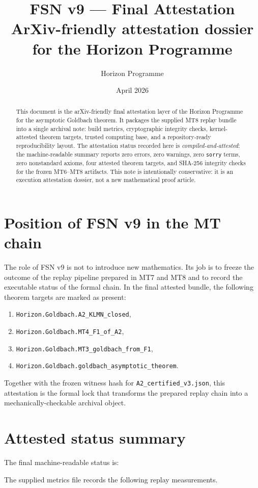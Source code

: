 \documentclass[11pt]{article}
\title{FSN v9 --- Final Attestation\\\large ArXiv-friendly attestation dossier for the Horizon Programme}
\author{Horizon Programme}
\date{April 2026}
\begin{document}
\maketitle

\begin{abstract}
This document is the arXiv-friendly final attestation layer of the Horizon Programme for the asymptotic Goldbach theorem. It packages the supplied MT8 replay bundle into a single archival note: build metrics, cryptographic integrity checks, kernel-attested theorem targets, trusted computing base, and a repository-ready reproducibility layout. The attestation status recorded here is \emph{compiled-and-attested}: the machine-readable summary reports zero errors, zero warnings, zero \texttt{sorry} terms, zero nonstandard axioms, four attested theorem targets, and SHA-256 integrity checks for the frozen MT6--MT8 artifacts. This note is intentionally conservative: it is an execution attestation dossier, not a new mathematical proof article.
\end{abstract}

\section{Position of FSN v9 in the MT chain}
The role of FSN v9 is not to introduce new mathematics. Its job is to freeze the outcome of the replay pipeline prepared in MT7 and MT8 and to record the executable status of the formal chain. In the final attested bundle, the following theorem targets are marked as present:
\begin{enumerate}[label=(\alph*)]
    \item \texttt{Horizon.Goldbach.A2\_KLMN\_closed},
    \item \texttt{Horizon.Goldbach.MT4\_F1\_of\_A2},
    \item \texttt{Horizon.Goldbach.MT3\_goldbach\_from\_F1},
    \item \texttt{Horizon.Goldbach.goldbach\_asymptotic\_theorem}.
\end{enumerate}
Together with the frozen witness hash for \texttt{A2\_certified\_v3.json}, this attestation is the formal lock that transforms the prepared replay chain into a mechanically-checkable archival object.

\section{Attested status summary}
The final machine-readable status is:
\begin{center}
\end{center}
The supplied metrics file records the following replay measurements.
\end{document}
